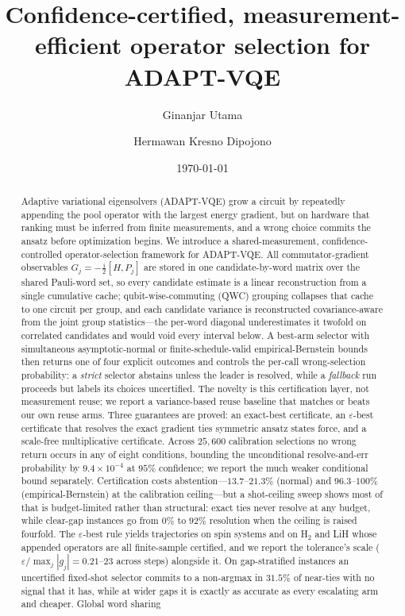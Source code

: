 \documentclass[aps,pra,reprint,superscriptaddress,nofootinbib,floatfix]{revtex4-2}
\newcommand{\ii}{\mathrm{i}}
\begin{document}
\title{Confidence-certified, measurement-efficient operator selection for ADAPT-VQE}

\author{Ginanjar Utama}

\author{Hermawan Kresno Dipojono}

\date{\today}

\begin{abstract}
Adaptive variational eigensolvers (ADAPT-VQE) grow a circuit by repeatedly appending the pool operator with the largest energy gradient, but on hardware that ranking must be inferred from finite measurements, and a wrong choice commits the ansatz before optimization begins. We introduce a shared-measurement, confidence-controlled operator-selection framework for ADAPT-VQE. All commutator-gradient observables $G_j=-\tfrac{\ii}{2}[H,P_j]$ are stored in one candidate-by-word matrix over the shared Pauli-word set, so every candidate estimate is a linear reconstruction from a single cumulative cache; qubit-wise-commuting (QWC) grouping collapses that cache to one circuit per group, and each candidate variance is reconstructed covariance-aware from the joint group statistics---the per-word diagonal underestimates it twofold on correlated candidates and would void every interval below. A best-arm selector with simultaneous asymptotic-normal or finite-schedule-valid empirical-Bernstein bounds then returns one of four explicit outcomes and controls the per-call wrong-selection probability: a \emph{strict} selector abstains unless the leader is resolved, while a \emph{fallback} run proceeds but labels its choices uncertified. The novelty is this certification layer, not measurement reuse; we report a variance-based reuse baseline that matches or beats our own reuse arms. Three guarantees are proved: an exact-best certificate, an $\varepsilon$-best certificate that resolves the exact gradient ties symmetric ansatz states force, and a scale-free multiplicative certificate. Across $25{,}600$ calibration selections no wrong return occurs in any of eight conditions, bounding the unconditional resolve-and-err probability by $9.4\times10^{-4}$ at $95\%$ confidence; we report the much weaker conditional bound separately. Certification costs abstention---$13.7$--$21.3\%$ (normal) and $96.3$--$100\%$ (empirical-Bernstein) at the calibration ceiling---but a shot-ceiling sweep shows most of that is budget-limited rather than structural: exact ties never resolve at any budget, while clear-gap instances go from $0\%$ to $92\%$ resolution when the ceiling is raised fourfold. The $\varepsilon$-best rule yields trajectories on spin systems and on H$_2$ and LiH whose appended operators are all finite-sample certified, and we report the tolerance's scale ($\varepsilon/\max_j|g_j|=0.21$--$23$ across steps) alongside it. On gap-stratified instances an uncertified fixed-shot selector commits to a non-argmax in $31.5\%$ of near-ties with no signal that it has, while at wider gaps it is exactly as accurate as every escalating arm and cheaper. Global word sharing 
\end{abstract}
\end{document}
